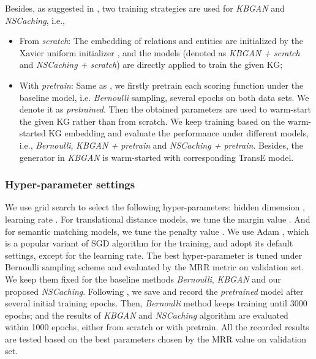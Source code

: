\documentclass[conference]{IEEEtran}
\begin{document}
Besides,
as suggested in \cite{cai2018kbgan,wang2018incorporating},
two training strategies are used for \textit{KBGAN} and \textit{NSCaching},
i.e.,
\begin{itemize}
\item From \textit{scratch}: The embedding of relations and entities are initialized by the Xavier uniform initializer \cite{glorot2010understanding},
and the models
 (denoted as \textit{KBGAN + scratch} and \textit{NSCaching + scratch})
are directly applied to train the given KG; 

\item With \textit{pretrain}:
Same as \cite{cai2018kbgan,wang2018incorporating},
we firstly pretrain each scoring function under the baseline model, i.e. \textit{Bernoulli} sampling, 
several epochs on both data sets. 
We denote it as \textit{pretrained}. 
Then the obtained parameters are used to warm-start the given KG rather than from scratch.
We keep training based on the warm-started KG embedding 
and evaluate the performance under different models,
i.e., \textit{Bernoulli}, \textit{KBGAN + pretrain} and \textit{NSCaching + pretrain}.
Besides, the generator in \textit{KBGAN} is warm-started with corresponding TransE model.
\end{itemize}

 








\subsubsection{Hyper-parameter settings}

We use grid search to select the following hyper-parameters:
hidden dimension ,
learning rate  .
For translational distance models, we tune the margin value .
And for semantic matching models, we tune the penalty value   \cite{trouillon2016complex}.
{We use Adam \cite{kingma2014adam}, 
	which is a popular variant of SGD algorithm for the training,
	and adopt its default settings, except for the learning rate.}
The best hyper-parameter is tuned under Bernoulli sampling scheme and evaluated by the MRR metric on validation set. 
We keep them fixed for the baseline methods \textit{Bernoulli}, \textit{KBGAN} and our proposed \textit{NSCaching}.
Following \cite{cai2018kbgan}, we save and record 
the \textit{pretrained} model after several initial training epochs.
Then, \textit{Bernoulli} method keeps training until 3000 epochs; and 
	the results of \textit{KBGAN} and \textit{NSCaching} algorithm are evaluated within 1000 epochs,
	either from scratch or with pretrain.
All the recorded results are tested based on the best parameters chosen by the MRR value on validation set.
\end{document}
